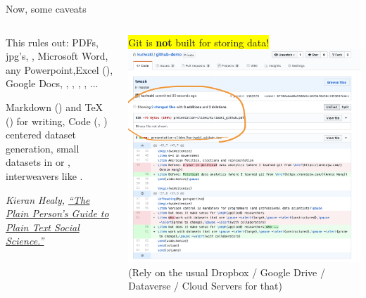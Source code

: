 \documentclass[ignorenonframetext,notes, 10pt, aspectratio=169]{beamer}
\begin{document}
\begin{frame}{Now, some caveats}
\begin{columns}[T]
\begin{column}{0.5\textwidth}

  This rules out:
   {\small \pause PDFs, \pause jpg's, \pause, Microsoft Word, \pause any Powerpoint,\pause Excel (), \pause Google Docs\pause,  , , , , ...}
\pause 
  \pause 

 {\small Markdown () and TeX () for writing,  \pause Code (, ) centered dataset generation, small datasets in  or , \pause interweavers  like .} \pause

\bigskip
 {\footnotesize \emph{Kieran Healy, \href{https://kieranhealy.org/publications/plain-person-text/}{``The Plain Person’s Guide to Plain Text Social Science.''}}}
 
\end{column}
\begin{column}{0.5\textwidth}
  \colorbox{yellow}{Git is {\textbf{not}} built for storing data!}\\
\centering
{\includegraphics[width = 0.9\linewidth]{pdf-notrack.png}}
\flushleft
  (Rely on the usual Dropbox / Google Drive / Dataverse / Cloud Servers for that)
\end{column}
\end{columns}
\end{frame}

\end{document}
